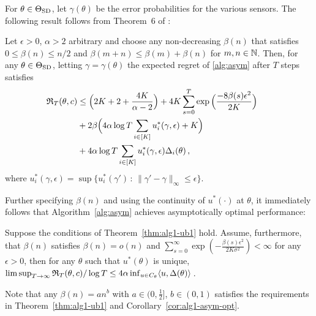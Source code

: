 \newcommand{\gap}{d}
\newcommand{\norm}[1]{\|#1\|}
For $\theta \in \Theta_{\mathrm{SD}}$, let $\gamma(\theta)$ be the error probabilities for the various sensors.
The following result follows from Theorem~6 of \cite{WGySz:NIPS15}:
\begin{thm} \label{thm:ftregret}
Let $\epsilon>0$, $\alpha>2$ arbitrary and choose any non-decreasing $\beta(n)$ that satisfies $0\le \beta(n)\le n/2$ and $\beta(m+n)\le \beta(m)+\beta(n)$ for $m,n\in \mathbb{N}$.
Then, 
for any
$\theta\in \Theta_{\mathrm{SD}}$, letting $\gamma = \gamma(\theta)$
the expected regret of \cref{alg:asym} after $T$ steps satisfies 
\begin{align*}
\mathfrak{R}_T(\theta,c)
  &\le  \Big( 2K+2+\frac{4K}{\alpha-2} \Big) 
  +  4K\sum_{s=0}^T \exp{\Big( \frac{-8\beta(s)\epsilon^2}{2K} \Big)}~~~~~ \\
 &+ 2 \beta\Big( 4\alpha\log T\sum_{i\in [K]} u_i^*(\gamma,\epsilon)+K \Big)\\
 & +  4\alpha\log T \sum_{i\in [K]} u_i^*(\gamma,\epsilon)\Delta_i(\theta) \,,
\end{align*}
where $u_i^*(\gamma,\epsilon) = \sup\{u_i^*(\gamma')\,:\, \norm{\gamma'-\gamma}_{\infty}\le \epsilon \}$.
\label{thm:alg1-ub1}
\end{thm}  
Further specifying $\beta(n)$ and using the continuity of $u^*(\cdot)$ at $\theta$, it immediately follows that Algorithm~\ref{alg:asym} achieves asymptotically optimal performance: 
\begin{cor}
\label{cor:alg1-asym-opt}
 Suppose the conditions of Theorem~\ref{thm:alg1-ub1} hold. Assume, furthermore, that $\beta(n)$ satisfies $\beta(n) = o(n)$ and $\sum_{s=0}^\infty \exp \left( -\frac{\beta(s)\epsilon^2}{2K\sigma^2} \right)<\infty$ for any $\epsilon>0$, then for any $\theta$ such that $u^*(\theta)$ is unique, 
$
\limsup_{T\rightarrow \infty} \mathfrak{R}_T(\theta,c)/\log T \le 4\alpha \inf_{u\in C_\theta} \langle u,\Delta(\theta) \rangle\,$.
\end{cor}
Note that any $\beta(n) = an^b$ with $a\in (0,\frac{1}{2}]$, $b\in (0,1)$ satisfies the requirements in Theorem~\ref{thm:alg1-ub1} and Corollary~\ref{cor:alg1-asym-opt}.




